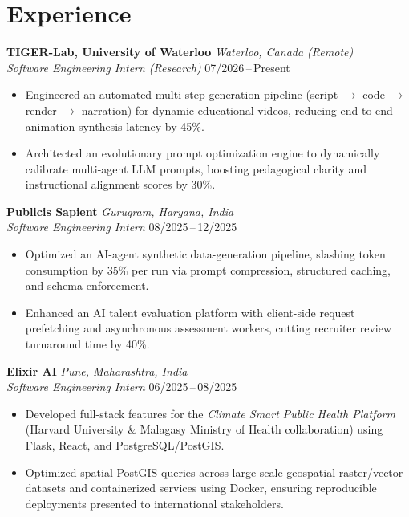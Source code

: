 \documentclass[10pt,a4paper]{article}
\begin{document}
\vspace{-0.15em}

\section{Experience}

\textbf{TIGER-Lab, University of Waterloo} \hfill \textit{Waterloo, Canada (Remote)}\\
\textit{Software Engineering Intern (Research)} \hfill 07/2026\,--\,Present
\begin{itemize}
  \item Engineered an automated multi-step generation pipeline (script $\to$ code $\to$ render $\to$ narration) for dynamic educational videos, reducing end-to-end animation synthesis latency by 45\%.
  \item Architected an evolutionary prompt optimization engine to dynamically calibrate multi-agent LLM prompts, boosting pedagogical clarity and instructional alignment scores by 30\%.
\end{itemize}

\vspace{0.22em}

\textbf{Publicis Sapient} \hfill \textit{Gurugram, Haryana, India}\\
\textit{Software Engineering Intern} \hfill 08/2025\,--\,12/2025
\begin{itemize}
  \item Optimized an AI-agent synthetic data-generation pipeline, slashing token consumption by 35\% per run via prompt compression, structured caching, and schema enforcement.
  \item Enhanced an AI talent evaluation platform with client-side request prefetching and asynchronous assessment workers, cutting recruiter review turnaround time by 40\%.
\end{itemize}

\vspace{0.22em}

\textbf{Elixir AI} \hfill \textit{Pune, Maharashtra, India}\\
\textit{Software Engineering Intern} \hfill 06/2025\,--\,08/2025
\begin{itemize}
  \item Developed full-stack features for the \textit{Climate Smart Public Health Platform} (Harvard University \& Malagasy Ministry of Health collaboration) using Flask, React, and PostgreSQL/PostGIS.
  \item Optimized spatial PostGIS queries across large-scale geospatial raster/vector datasets and containerized services using Docker, ensuring reproducible deployments presented to international stakeholders.
\end{itemize}
\end{document}
